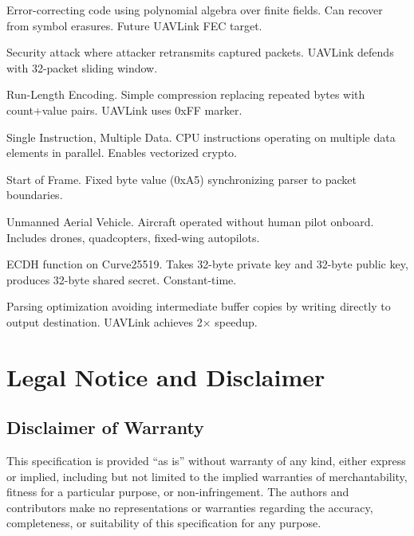 \documentclass[11pt,a4paper]{article}
\begin{document}
\begin{description}[style=nextline]
    \item[Reed-Solomon] Error-correcting code using polynomial algebra over finite fields. Can recover from symbol erasures. Future UAVLink FEC target.
    
    \item[Replay Attack] Security attack where attacker retransmits captured packets. UAVLink defends with 32-packet sliding window.
    
    \item[RLE] Run-Length Encoding. Simple compression replacing repeated bytes with count+value pairs. UAVLink uses 0xFF marker.
    
    \item[SIMD] Single Instruction, Multiple Data. CPU instructions operating on multiple data elements in parallel. Enables vectorized crypto.
    
    \item[SOF] Start of Frame. Fixed byte value (0xA5) synchronizing parser to packet boundaries.
    
    \item[UAV] Unmanned Aerial Vehicle. Aircraft operated without human pilot onboard. Includes drones, quadcopters, fixed-wing autopilots.
    
    \item[X25519] ECDH function on Curve25519. Takes 32-byte private key and 32-byte public key, produces 32-byte shared secret. Constant-time.
    
    \item[Zero-Copy] Parsing optimization avoiding intermediate buffer copies by writing directly to output destination. UAVLink achieves 2$\times$ speedup.
\end{description}

\newpage
\section*{Legal Notice and Disclaimer}

\subsection*{Disclaimer of Warranty}

This specification is provided ``as is'' without warranty of any kind, either express or implied, including but not limited to the implied warranties of merchantability, fitness for a particular purpose, or non-infringement. The authors and contributors make no representations or warranties regarding the accuracy, completeness, or suitability of this specification for any purpose.
\end{document}

